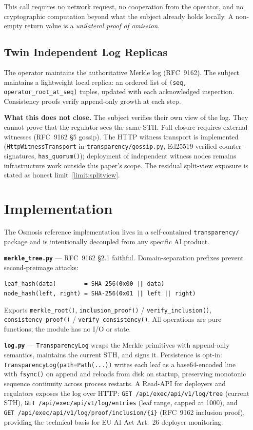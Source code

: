 \documentclass[11pt,a4paper]{article}
\newcommand{\code}[1]{\texttt{#1}}
\newcommand{\term}[1]{\emph{#1}}
\begin{document}
This call requires no network request, no cooperation from the operator, and no
cryptographic computation beyond what the subject already holds locally. A non-empty
return value is a \term{unilateral proof of omission}.

\subsection{Twin Independent Log Replicas}
\label{sec:twin}

The operator maintains the authoritative Merkle log (RFC~9162). The subject maintains
a lightweight local replica: an ordered list of \code{(seq, operator\_root\_at\_seq)}
tuples, updated with each acknowledged inspection. Consistency proofs verify
append-only growth at each step.

\textbf{What this does not close.} The subject verifies their own view of the log. They
cannot prove that the regulator sees the same STH. Full closure requires external
witnesses (RFC~9162 \S5 gossip). The HTTP witness transport is implemented
(\code{HttpWitnessTransport} in \code{transparency/gossip.py}, Ed25519-verified
counter-signatures, \code{has\_quorum()}); deployment of independent witness nodes
remains infrastructure work outside this paper's scope. The residual split-view
exposure is stated as honest limit~\ref{limit:splitview}.

\section{Implementation}

The Osmosis reference implementation lives in a self-contained \code{transparency/} package and is
intentionally decoupled from any specific AI product.

\textbf{\code{merkle\_tree.py}} --- RFC~9162 \S2.1 faithful. Domain-separation prefixes
prevent second-preimage attacks:
\begin{lstlisting}
leaf_hash(data)        = SHA-256(0x00 || data)
node_hash(left, right) = SHA-256(0x01 || left || right)
\end{lstlisting}
Exports \code{merkle\_root()}, \code{inclusion\_proof()} / \code{verify\_inclusion()},
\code{consistency\_proof()} / \code{verify\_consistency()}. All operations are pure
functions; the module has no I/O or state.

\textbf{\code{log.py}} --- \code{TransparencyLog} wraps the Merkle primitives with
append-only semantics, maintains the current STH, and signs it. Persistence is opt-in:
\code{TransparencyLog(path=Path(...))} writes each leaf as a base64-encoded line with
\code{fsync()} on append and reloads from disk on startup, preserving monotonic sequence
continuity across process restarts. A Read-API for deployers and regulators exposes the
log over HTTP: \code{GET /api/exec/api/v1/log/tree} (current STH),
\code{GET /api/exec/api/v1/log/entries} (leaf range, capped at 1000), and
\code{GET /api/exec/api/v1/log/proof/inclusion/\{i\}} (RFC~9162 inclusion proof),
providing the technical basis for EU AI Act Art.~26 deployer monitoring.
\end{document}
